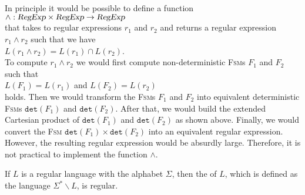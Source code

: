 \remarkEng
In principle it would be possible to define a function
\\[0.2cm]
\hspace*{1.3cm}
$\wedge: \textsl{RegExp} \times \textsl{RegExp} \rightarrow \textsl{RegExp}$
\\[0.2cm]
that takes to regular expressions $r_1$ and $r_2$ and returns a regular expression  $r_1 \wedge r_2$ such that
we have
\\[0.2cm]
\hspace*{1.3cm}
$L(r_1 \wedge r_2) = L(r_1) \cap L(r_2)$.
\\[0.2cm]
To compute $r_1 \wedge r_2$ we would first compute non-deterministic \textsc{Fsm}s  $F_1$ and $F_2$ such that
\\[0.2cm]
\hspace*{1.3cm}
$L(F_1) = L(r_1)$ \quad and \quad $L(F_2) = L(r_2)$
\\[0.2cm] 
holds.  Then we would transform the \textsc{Fsm}s $F_1$ and $F_2$ into equivalent deterministic 
\textsc{Fsm}s $\mathtt{det}(F_1)$ and $\mathtt{det}(F_2)$.  After that, we would build
the extended Cartesian product of $\mathtt{det}(F_1)$ and $\mathtt{det}(F_2)$ as shown above. 
Finally, we would convert the \textsc{Fsm} $\mathtt{det}(F_1) \times\mathtt{det}(F_2)$ into an equivalent
regular expression.  However, the resulting regular expression would be absurdly large.
Therefore, it is not practical to implement the function $\wedge$.
\eox


\begin{Proposition}
  If $L$ is a regular language with the alphabet $\Sigma$, then the  
  of $L$, which is defined as the language $\Sigma^* \backslash L$, is regular.
\end{Proposition}

